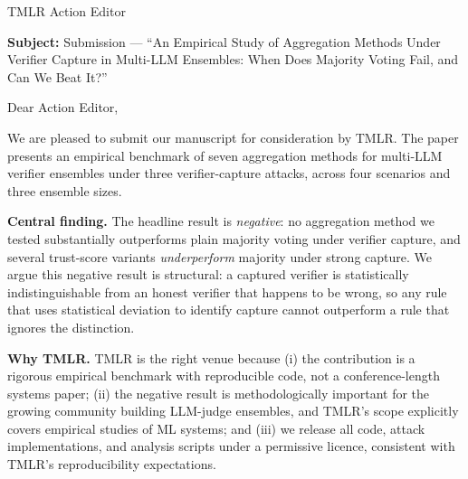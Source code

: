 \documentclass[11pt]{letter}
\begin{document}
\begin{letter}{TMLR Action Editor}

\textbf{Subject:} Submission --- ``An Empirical Study of Aggregation
Methods Under Verifier Capture in Multi-LLM Ensembles: When Does
Majority Voting Fail, and Can We Beat It?''

\bigskip

Dear Action Editor,

\bigskip

We are pleased to submit our manuscript for consideration by TMLR.
The paper presents an empirical benchmark of seven aggregation methods
for multi-LLM verifier ensembles under three verifier-capture attacks,
across four scenarios and three ensemble sizes.

\bigskip

\noindent\textbf{Central finding.} The headline result is
\emph{negative}: no aggregation method we tested substantially
outperforms plain majority voting under verifier capture, and several
trust-score variants \emph{underperform} majority under strong capture.
We argue this negative result is structural: a captured verifier is
statistically indistinguishable from an honest verifier that happens
to be wrong, so any rule that uses statistical deviation to identify
capture cannot outperform a rule that ignores the distinction.

\bigskip

\noindent\textbf{Why TMLR.} TMLR is the right venue because (i) the
contribution is a rigorous empirical benchmark with reproducible code,
not a conference-length systems paper; (ii) the negative result is
methodologically important for the growing community building LLM-judge
ensembles, and TMLR's scope explicitly covers empirical studies of ML
systems; and (iii) we release all code, attack implementations, and
analysis scripts under a permissive licence, consistent with TMLR's
reproducibility expectations.

\bigskip


\end{letter}
\end{document}
